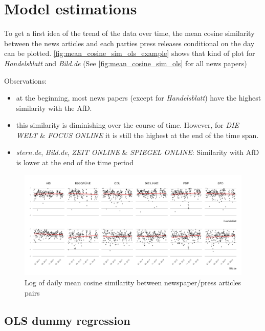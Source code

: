 \documentclass[
]{article}
\begin{document}
\hypertarget{model-estimations}{%
\section{Model estimations}\label{model-estimations}}

To get a first idea of the trend of the data over time, the mean cosine
similarity between the news articles and each parties press releases
conditional on the day can be plotted.
\autoref{fig:mean_cosine_sim_ols_example} shows that kind of plot for
\emph{Handelsblatt} and \emph{Bild.de} (See
\autoref{fig:mean_cosine_sim_ols} for all news papers)

Observations:

\begin{itemize}
\item
  at the beginning, most news papers (except for \emph{Handelsblatt})
  have the highest similarity with the AfD.
\item
  this similarity is diminishing over the course of time. However, for
  \emph{DIE WELT} \& \emph{FOCUS ONLINE} it is still the highest at the
  end of the time span.
\item
  \emph{stern.de}, \emph{Bild.de}, \emph{ZEIT ONLINE} \& \emph{SPIEGEL
  ONLINE}: Similarity with AfD is lower at the end of the time period
\end{itemize}

\begin{figure}

{\centering \includegraphics[width=0.8\linewidth]{main_text_files/figure-latex/Daily mean cosine similarity - example-1} 

}

\caption{Log of daily mean cosine similarity between newspaper/press articles pairs \label{fig:mean_cosine_sim_ols_example}}\label{fig:Daily mean cosine similarity - example}
\end{figure}

\hypertarget{ols-dummy-regression}{%
\subsection{OLS dummy regression}\label{ols-dummy-regression}}
\end{document}

